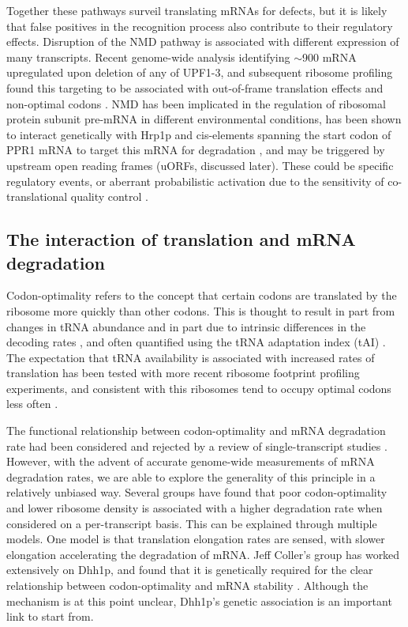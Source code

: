 Together
these pathways surveil translating mRNAs for defects, but it is likely
that false positives in the recognition process also contribute to
their regulatory effects.  
Disruption of the NMD pathway is associated
with different expression of many transcripts. Recent genome-wide
analysis identifying $\sim$900 mRNA upregulated upon deletion of any of
UPF1-3, and subsequent ribosome profiling found this targeting to be
associated with out-of-frame translation effects and non-optimal
codons \parencite{celik2017high}.
NMD has been implicated in the regulation
of ribosomal protein subunit pre-mRNA 
\parencite{garre2013nonsense}
in different
environmental conditions, has been shown to interact genetically with
Hrp1p and cis-elements spanning the start codon of PPR1 mRNA to target
this mRNA for degradation 
\parencite{pierrat19935,kebaara2003upf},
and may be triggered by upstream open reading frames (uORFs, discussed
later). These could be specific regulatory events, 
or aberrant probabilistic
activation due to the sensitivity of co-translational quality control
\parencite{celik2017high}.


\subsection{The interaction of translation and mRNA
degradation}

Codon-optimality refers to the concept that certain codons
are translated by the ribosome more quickly than other codons. This is
thought to result in part from changes in tRNA abundance and in part
due to intrinsic differences in the decoding rates 
\parencite{curran1989rates,thomas1988codon}, and often quantified
using the tRNA adaptation index (tAI)
\parencite{reis2004solving}. The expectation that tRNA availability is
associated with increased rates of translation has been tested with
more recent ribosome footprint profiling experiments, and consistent
with this ribosomes tend to occupy optimal codons less often 
\parencite{weinberg2016improved}.  

The functional relationship between codon-optimality
and mRNA degradation rate had been considered and rejected by a review
of single-transcript studies 
\parencite{caponigro1996mechanisms}. However,
with the advent of accurate genome-wide measurements of mRNA
degradation rates, we are able to explore the generality of this
principle in a relatively unbiased way. Several groups 
\parencite{presnyak2015codon,neymotin2016multiple,harigaya2016codon,cheng2017cis}
have found that poor codon-optimality and lower ribosome density
is associated with a higher degradation rate when considered on a
per-transcript basis. This can be explained through multiple models.
One model is that translation elongation rates are sensed, with slower
elongation accelerating the degradation of mRNA. Jeff Coller's group
has worked extensively on Dhh1p, and found that it is genetically
required for the clear relationship between codon-optimality and mRNA
stability 
\parencite{presnyak2015codon,radhakrishnan2016dead}. Although
the mechanism is at this point unclear, Dhh1p's genetic association 
is an important link to start from.

